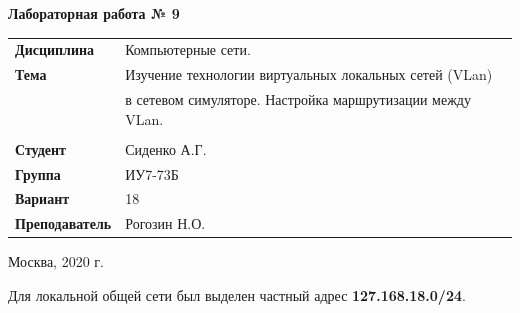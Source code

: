 \documentclass[a4paper,14pt]{extreport} %
\begin{document}
\begin{titlepage}
    \vspace{2cm}

    \begin{center}
        \textbf{Лабораторная работа № 9} \\
        \vspace{0.5cm}
    \end{center}

    \vspace{4cm}

    \begin{flushleft}
        \begin{tabular}{ll}
            \textbf{Дисциплина} & Компьютерные сети.  \\
            \textbf{Тема} & Изучение технологии виртуальных локальных сетей (VLan)  \\
            & в сетевом симуляторе. Настройка маршрутизации между VLan.  \\
            \\
            \textbf{Студент} & Сиденко А.Г. \\
            \textbf{Группа} & ИУ7-73Б \\
            \textbf{Вариант} & 18\\
            \textbf{Преподаватель} & Рогозин Н.О.  \\
        \end{tabular}
    \end{flushleft}

    \vspace{4cm}

   \begin{center}
        Москва, 2020 г.
    \end{center}

\end{titlepage}

Для локальной общей сети был выделен частный адрес \textbf{127.168.18.0/24}. 
\end{document}
